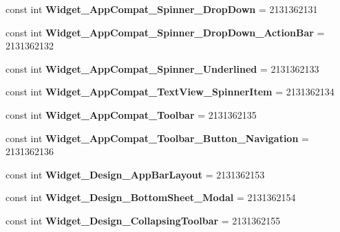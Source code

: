 \begin{DoxyCompactItemize}
const int {\bfseries Widget\+\_\+\+App\+Compat\+\_\+\+Spinner\+\_\+\+Drop\+Down} = 2131362131
\item 
\mbox{\label{classXaria_1_1Resource_1_1Style_aec49ac4a132e3bf5d912874c5645e75a}} 
const int {\bfseries Widget\+\_\+\+App\+Compat\+\_\+\+Spinner\+\_\+\+Drop\+Down\+\_\+\+Action\+Bar} = 2131362132
\item 
\mbox{\label{classXaria_1_1Resource_1_1Style_a7bdc7676648dfb9bc549ceeab7e377ba}} 
const int {\bfseries Widget\+\_\+\+App\+Compat\+\_\+\+Spinner\+\_\+\+Underlined} = 2131362133
\item 
\mbox{\label{classXaria_1_1Resource_1_1Style_a2f02e5460fc5ccc045ad84bb4c6ad161}} 
const int {\bfseries Widget\+\_\+\+App\+Compat\+\_\+\+Text\+View\+\_\+\+Spinner\+Item} = 2131362134
\item 
\mbox{\label{classXaria_1_1Resource_1_1Style_a6ee7b24a9519361ddf9a12f91a9962ff}} 
const int {\bfseries Widget\+\_\+\+App\+Compat\+\_\+\+Toolbar} = 2131362135
\item 
\mbox{\label{classXaria_1_1Resource_1_1Style_a7d0a3db253feedff6a891fcd64832b95}} 
const int {\bfseries Widget\+\_\+\+App\+Compat\+\_\+\+Toolbar\+\_\+\+Button\+\_\+\+Navigation} = 2131362136
\item 
\mbox{\label{classXaria_1_1Resource_1_1Style_adb2a14d263c9188db1d606437a8b6c57}} 
const int {\bfseries Widget\+\_\+\+Design\+\_\+\+App\+Bar\+Layout} = 2131362153
\item 
\mbox{\label{classXaria_1_1Resource_1_1Style_ab56bc9c73a970b407dc23e0e88ce3a79}} 
const int {\bfseries Widget\+\_\+\+Design\+\_\+\+Bottom\+Sheet\+\_\+\+Modal} = 2131362154
\item 
\mbox{\label{classXaria_1_1Resource_1_1Style_ad2d00c4bd33e824c0d829423c0dc1161}} 
const int {\bfseries Widget\+\_\+\+Design\+\_\+\+Collapsing\+Toolbar} = 2131362155
\item 
\mbox{\label{classXaria_1_1Resource_1_1Style_a23df908450eb0dd21a3879faeb2f60a6}} 

\end{DoxyCompactItemize}
